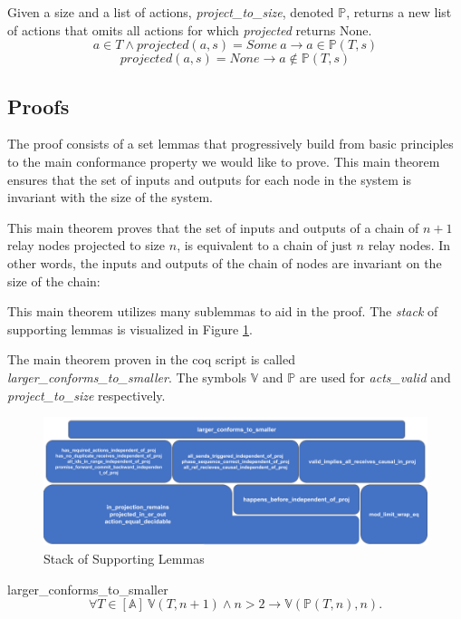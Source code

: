 \documentclass[runningheads]{llncs}
\newcommand{\action}{\mathds{A}}
\newcommand{\listaction}{[\action]}
\newcommand{\actsvalid}[2]{\mathds{V}(#1, #2)}
\newcommand{\projectsize}[2]{\mathds{P}(#1, #2)}
\begin{document}
\begin{definition}
Given a size and a list of actions, \emph{project\_to\_size}, denoted $\mathds{P}$, returns a new list of actions that omits all actions for which \emph{projected} returns None. 
$$
a \in T \wedge projected(a, s) = Some\ a \longrightarrow a \in \projectsize{T}{s}
$$
$$
projected(a, s) = None \longrightarrow a \notin \projectsize{T}{s}
$$
\end{definition}

\subsection{Proofs}
\label{sec:proofs}

The proof consists of a set lemmas that progressively build from basic principles to the main conformance property we would like to prove. This main theorem ensures that the set of inputs and outputs for each node in the system is invariant with the size of the system. 

This main theorem proves that the set of inputs and outputs of a chain of $n+1$ relay nodes projected to size $n$, is equivalent to a chain of just $n$ relay nodes. In other words, the inputs and outputs of the chain of nodes are invariant on the size of the chain: 

This main theorem utilizes many sublemmas to aid in the proof.
The \emph{stack} of supporting lemmas is visualized in Figure \ref{fig:coqLemmaStack}.


The main theorem proven in the coq script is called \sloppy \emph{larger\_conforms\_to\_smaller}. 
The symbols $\mathds{V}$ and $\mathds{P}$ are used for \emph{acts\_valid} and \emph{project\_to\_size} respectively. 

\begin{figure}[h]
    \centering
    \includegraphics[scale=0.35]{CoqLemmaStack.png}
    \caption{Stack of Supporting Lemmas}
    \label{fig:coqLemmaStack}
\end{figure}

\begin{theorem}{larger\_conforms\_to\_smaller}
\label{thm:maintheorem}
$$\forall T \in \listaction\ \actsvalid{T}{n+1} \wedge n > 2 \longrightarrow \actsvalid{\projectsize{T}{n}}{n}.$$
\end{theorem}
\end{document}
